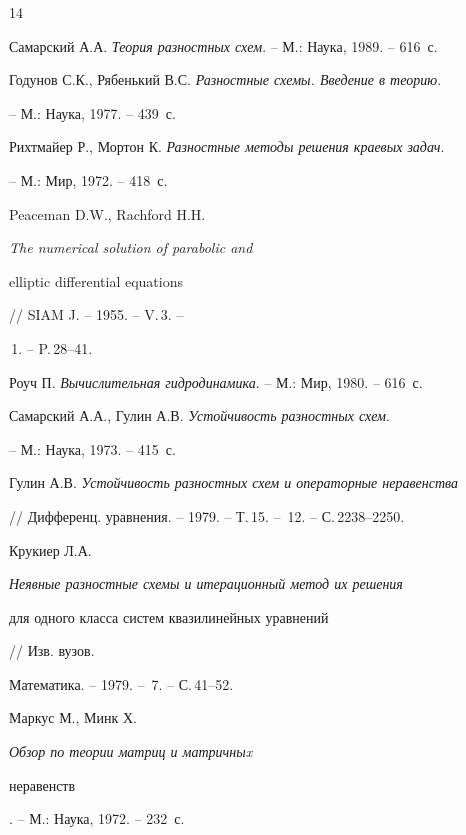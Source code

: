 \begin{thebibliography}{14}







Самарский А.А. {\it Теория разностных схем}. -- М.: Наука, 1989. -- 616~с.




Годунов С.К., Рябенький В.С. {\it Разностные схемы. Введение в теорию}.


-- М.: Наука, 1977. -- 439~с.




Рихтмайер Р., Мортон К. {\it Разностные методы решения краевых задач}.


-- М.: Мир, 1972. -- 418~с.




Peaceman D.W., Rachford H.H. {\it The numerical solution of parabolic and 


elliptic differential equations} // SIAM J. -- 1955. -- V.\,3. --


\No\,1. -- P.\,28--41.




Роуч П. {\it Вычислительная гидродинамика}. -- М.: Мир, 1980. -- 616~с.




Самарский А.А., Гулин А.В. {\it Устойчивость разностных схем}.


-- М.: Наука, 1973. -- 415~с.




Гулин А.В. {\it Устойчивость разностных схем и операторные неравенства}


// Дифференц. уравнения. -- 1979. -- Т.\,15. -- \No\,12. -- С.\,2238--2250.




Крукиер Л.А. {\it Неявные разностные схемы и итерационный метод их решения 


для одного класса систем квазилинейных уравнений} // Изв. вузов.


Математика. -- 1979. -- \No\,7. -- С.\,41--52.




Маркус М., Минк Х. {\it Обзор по теории матриц и матричныx 


неравенств}. -- М.: Наука, 1972. -- 232~с.





\end{thebibliography}
